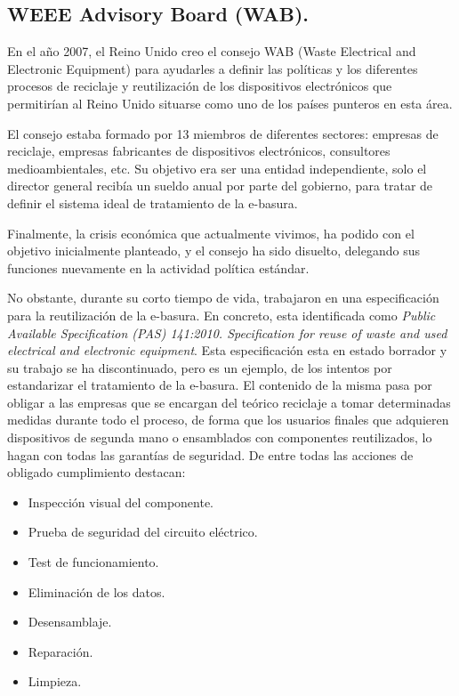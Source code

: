 \subsection{WEEE Advisory Board (WAB).}

En el año 2007, el Reino Unido creo el consejo WAB (Waste Electrical and Electronic Equipment) para ayudarles a definir las políticas y los diferentes procesos de reciclaje y reutilización de los dispositivos electrónicos que permitirían al Reino Unido situarse como uno de los países punteros en esta área.

El consejo estaba formado por 13 miembros de diferentes sectores: empresas de reciclaje, empresas fabricantes de dispositivos electrónicos, consultores medioambientales, etc. Su objetivo era ser una entidad independiente, solo el director general recibía un sueldo anual por parte del gobierno, para tratar de definir el sistema ideal de tratamiento de la e-basura.

Finalmente, la crisis económica que actualmente vivimos, ha podido con el objetivo inicialmente planteado, y el consejo ha sido disuelto, delegando sus funciones nuevamente en la actividad política estándar.

No obstante, durante su corto tiempo de vida, trabajaron en una especificación para la reutilización de la e-basura. En concreto, esta identificada como \emph{Public Available Specification (PAS) 141:2010. Specification for reuse of waste and used electrical and electronic equipment}. Esta especificación esta en estado borrador y su trabajo se ha discontinuado, pero es un ejemplo, de los intentos por estandarizar el tratamiento de la e-basura. El contenido de la misma pasa por obligar a las empresas que se encargan del teórico reciclaje a tomar determinadas medidas durante todo el proceso, de forma que los usuarios finales que adquieren dispositivos de segunda mano o ensamblados con componentes reutilizados, lo hagan con todas las garantías de seguridad. De entre todas las acciones de obligado cumplimiento destacan:

\begin{itemize}

\item{Inspección visual del componente.}
\item{Prueba de seguridad del circuito eléctrico.}
\item{Test de funcionamiento.}
\item{Eliminación de los datos.}
\item{Desensamblaje.}
\item{Reparación.}
\item{Limpieza.}

\end{itemize}

